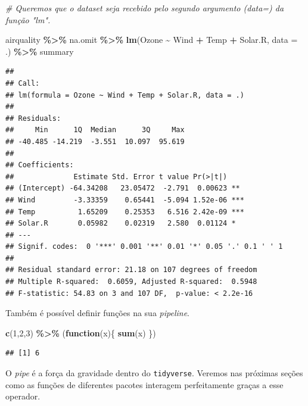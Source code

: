 \documentclass[
]{book}
\newenvironment{Shaded}{\begin{snugshade}}{\end{snugshade}}
\newcommand{\CommentTok}[1]{\textcolor[rgb]{0.56,0.35,0.01}{\textit{#1}}}
\newcommand{\ControlFlowTok}[1]{\textcolor[rgb]{0.13,0.29,0.53}{\textbf{#1}}}
\newcommand{\DataTypeTok}[1]{\textcolor[rgb]{0.13,0.29,0.53}{#1}}
\newcommand{\DecValTok}[1]{\textcolor[rgb]{0.00,0.00,0.81}{#1}}
\newcommand{\KeywordTok}[1]{\textcolor[rgb]{0.13,0.29,0.53}{\textbf{#1}}}
\newcommand{\NormalTok}[1]{#1}
\newcommand{\OperatorTok}[1]{\textcolor[rgb]{0.81,0.36,0.00}{\textbf{#1}}}
\newcommand{\StringTok}[1]{\textcolor[rgb]{0.31,0.60,0.02}{#1}}
\begin{document}
\begin{Shaded}
\begin{Highlighting}[]
\CommentTok{\# Queremos que o dataset seja recebido pelo segundo argumento (data=) da função "lm".}

\NormalTok{airquality }\OperatorTok{\%>\%}
\StringTok{  }\NormalTok{na.omit }\OperatorTok{\%>\%}
\StringTok{  }\KeywordTok{lm}\NormalTok{(Ozone }\OperatorTok{\textasciitilde{}}\StringTok{ }\NormalTok{Wind }\OperatorTok{+}\StringTok{ }\NormalTok{Temp }\OperatorTok{+}\StringTok{ }\NormalTok{Solar.R, }\DataTypeTok{data =}\NormalTok{ .) }\OperatorTok{\%>\%}
\StringTok{  }\NormalTok{summary}
\end{Highlighting}
\end{Shaded}

\begin{verbatim}
## 
## Call:
## lm(formula = Ozone ~ Wind + Temp + Solar.R, data = .)
## 
## Residuals:
##     Min      1Q  Median      3Q     Max 
## -40.485 -14.219  -3.551  10.097  95.619 
## 
## Coefficients:
##              Estimate Std. Error t value Pr(>|t|)    
## (Intercept) -64.34208   23.05472  -2.791  0.00623 ** 
## Wind         -3.33359    0.65441  -5.094 1.52e-06 ***
## Temp          1.65209    0.25353   6.516 2.42e-09 ***
## Solar.R       0.05982    0.02319   2.580  0.01124 *  
## ---
## Signif. codes:  0 '***' 0.001 '**' 0.01 '*' 0.05 '.' 0.1 ' ' 1
## 
## Residual standard error: 21.18 on 107 degrees of freedom
## Multiple R-squared:  0.6059, Adjusted R-squared:  0.5948 
## F-statistic: 54.83 on 3 and 107 DF,  p-value: < 2.2e-16
\end{verbatim}

Também é possível definir funções na sua \emph{pipeline}.

\begin{Shaded}
\begin{Highlighting}[]
\KeywordTok{c}\NormalTok{(}\DecValTok{1}\NormalTok{,}\DecValTok{2}\NormalTok{,}\DecValTok{3}\NormalTok{) }\OperatorTok{\%>\%}
\StringTok{  }\NormalTok{(}\ControlFlowTok{function}\NormalTok{(x)\{}
    \KeywordTok{sum}\NormalTok{(x)}
\NormalTok{  \})}
\end{Highlighting}
\end{Shaded}

\begin{verbatim}
## [1] 6
\end{verbatim}

O \emph{pipe} é a força da gravidade dentro do \texttt{tidyverse}. Veremos nas próximas seções como as funções de diferentes pacotes interagem perfeitamente graças a esse operador.
\end{document}
